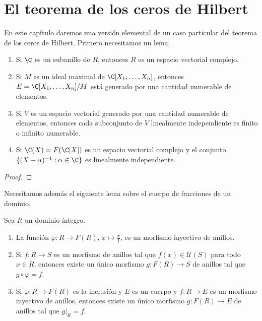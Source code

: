 \chapter{El teorema de los ceros de Hilbert}

En este capítulo daremos una versión elemental de un
caso particular del teorema de los ceros de Hilbert.
Primero necesitamos un lema.

\begin{lemma}
\begin{enumerate}
    \item Si $\C$ es un subanillo de $R$, entonces $R$ es un espacio vectorial complejo.
    \item Si $M$ es un ideal maximal de $\C[X_1,\dots,X_n]$, entonces $E=\C[X_1,\dots,X_n]/M$ está generado por una cantidad numerable de elementos.
    \item Si $V$ es un espacio vectorial generado por una cantidad numerable de elementos, entonces cada subconjunto de $V$ 
    linealmente independiente es finito o infinito numerable. 
    \item Si $\C(X)=F(\C[X])$ es un espacio vectorial complejo y el conjunto $\{(X-\alpha)^{-1}:\alpha\in\C\}$ es linealmente independiente.
\end{enumerate}
\end{lemma}

\begin{proof}

\end{proof}

Necesitamos además el siguiente lema sobre el cuerpo de fracciones de un dominio. 

\begin{lemma}
Sea $R$ un dominio íntegro. 
\begin{enumerate}
    \item La función $\varphi\colon R\to F(R)$, $x\mapsto \frac{x}{1}$, es un morfismo inyectivo de anillos.
    \item Si $f\colon R\to S$ es un morfismo de anillos tal que $f(x)\in\mathcal{U}(S)$ para todo $x\in R$, entonces existe
    un único morfismo $g\colon F(R)\to S$ de anillos tal que $g\circ\varphi=f$.
    \item Si $\varphi\colon R\to F(R)$ es la inclusión y $E$ es un cuerpo y $f\colon R\to E$ es un morfismo inyectivo de anillos, entonces existe un único morfismo 
    $g\colon F(R)\to E$ de anillos tal que $g|_R=f$. 
\end{enumerate}
\end{lemma}

